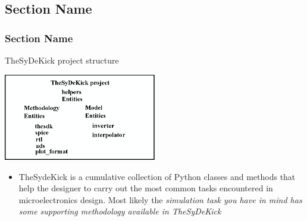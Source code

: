 \documentclass{sdkslides}
\newcommand{\sectname}{Section Name}
\begin{document}
\subsection*{\sectname}
\begin{frame}[t]
    \frametitle{\sectname}
    \begin{block}{TheSyDeKick project structure}
        \begin{center}
            \includegraphics[width=0.5\textwidth]{Pics/TheSyDeKick-entity-principles.eps}
        \end{center}
    \end{block}
    \begin{itemize}
        \item TheSydeKick is a cumulative collection of Python classes and
            methods that help the designer to carry out the most common
            tasks encountered in microelectronics design. Most likely the
            \emph{simulation task you have in mind has some supporting
            methodology available in TheSyDeKick}
    \end{itemize}
\end{frame}

\renewcommand{\sectname}{TheSyDeKick project structure}
\end{document}
